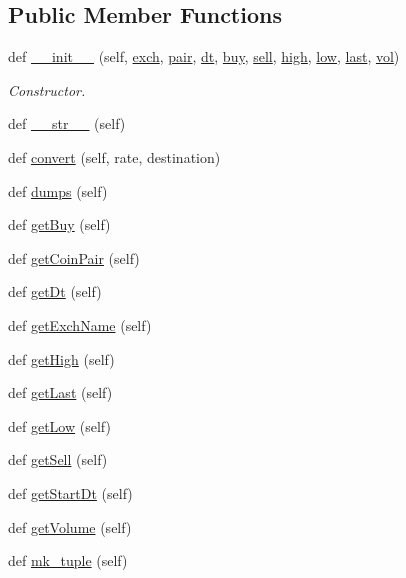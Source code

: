 \subsection*{Public Member Functions}
\begin{DoxyCompactItemize}
\item 
def \hyperlink{classexchange_1_1_ticker_a4a8c99ada461a4aeb960c14020a47736}{\+\_\+\+\_\+init\+\_\+\+\_\+} (self, \hyperlink{classexchange_1_1_ticker_a33f33fe9a12da3ce52938afdc577c061}{exch}, \hyperlink{classexchange_1_1_ticker_a382f9199d13a7b5929a26065fad4e491}{pair}, \hyperlink{classexchange_1_1_ticker_a45e3162d9956cee797f21d93c44c6baf}{dt}, \hyperlink{classexchange_1_1_ticker_a2ca48c3fa9aba92241392a05bef39324}{buy}, \hyperlink{classexchange_1_1_ticker_a5ba9e257d2ed28f02528a37d9ebd793e}{sell}, \hyperlink{classexchange_1_1_ticker_aace381ca15468df6a40e8d86b7710a7f}{high}, \hyperlink{classexchange_1_1_ticker_a1c1f26a47a82fc799fcebf158e104405}{low}, \hyperlink{classexchange_1_1_ticker_add7c2d95fa790dcdffddae2e584ce5f5}{last}, \hyperlink{classexchange_1_1_ticker_a24c0dd396aebc54c06e429a68c964ea3}{vol})
\begin{DoxyCompactList}\small\item\em Constructor. \end{DoxyCompactList}\item 
def \hyperlink{classexchange_1_1_ticker_af91836a1c408f54dda95d9865cefba45}{\+\_\+\+\_\+str\+\_\+\+\_\+} (self)
\item 
def \hyperlink{classexchange_1_1_ticker_a2aa851437f953462f8e8bce7ca05c3ec}{convert} (self, rate, destination)
\item 
def \hyperlink{classexchange_1_1_ticker_a53148d54a0b9b577870db785fb4e381e}{dumps} (self)
\item 
def \hyperlink{classexchange_1_1_ticker_a79d8a00f91a77b91b7126086e4beb569}{get\+Buy} (self)
\item 
def \hyperlink{classexchange_1_1_ticker_a11ddd0cbd2eaa9543ed7aec6ec78bcb1}{get\+Coin\+Pair} (self)
\item 
def \hyperlink{classexchange_1_1_ticker_aaa2f7d66782b9405c286e98bfb281d45}{get\+Dt} (self)
\item 
def \hyperlink{classexchange_1_1_ticker_a2e5bb124c8f6dcad031ef9a023079081}{get\+Exch\+Name} (self)
\item 
def \hyperlink{classexchange_1_1_ticker_a56eafe93405eb1e7192cc6d0c8497ebc}{get\+High} (self)
\item 
def \hyperlink{classexchange_1_1_ticker_a216982e99134953ee6e65d2243c3d793}{get\+Last} (self)
\item 
def \hyperlink{classexchange_1_1_ticker_ad398514a81ef5e8e2c71b610766b3d14}{get\+Low} (self)
\item 
def \hyperlink{classexchange_1_1_ticker_a309466a5a30813e7feda0f001d633ac9}{get\+Sell} (self)
\item 
def \hyperlink{classexchange_1_1_ticker_a70ccf798c847515b67cc474ec35e933c}{get\+Start\+Dt} (self)
\item 
def \hyperlink{classexchange_1_1_ticker_aaee4b5454a701e8f468ccca714e7ee59}{get\+Volume} (self)
\item 
def \hyperlink{classexchange_1_1_ticker_aba1398da3113a7ff17b2496ce92c7238}{mk\+\_\+tuple} (self)
\end{DoxyCompactItemize}
